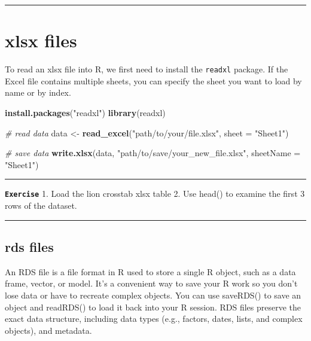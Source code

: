 \documentclass[
]{book}
\newenvironment{Shaded}{\begin{snugshade}}{\end{snugshade}}
\newcommand{\AttributeTok}[1]{\textcolor[rgb]{0.13,0.29,0.53}{#1}}
\newcommand{\CommentTok}[1]{\textcolor[rgb]{0.56,0.35,0.01}{\textit{#1}}}
\newcommand{\FunctionTok}[1]{\textcolor[rgb]{0.13,0.29,0.53}{\textbf{#1}}}
\newcommand{\NormalTok}[1]{#1}
\newcommand{\OtherTok}[1]{\textcolor[rgb]{0.56,0.35,0.01}{#1}}
\newcommand{\StringTok}[1]{\textcolor[rgb]{0.31,0.60,0.02}{#1}}
\begin{document}
\begin{center}\rule{0.5\linewidth}{0.5pt}\end{center}

\section{xlsx files}\label{xlsx-files}

To read an xlsx file into R, we first need to install the \texttt{readxl} package. If the Excel file contains multiple sheets, you can specify the sheet you want to load by name or by index.

\begin{Shaded}
\begin{Highlighting}[]
\FunctionTok{install.packages}\NormalTok{(}\StringTok{"readxl"}\NormalTok{)}
\FunctionTok{library}\NormalTok{(readxl)}

\CommentTok{\# read data}
\NormalTok{data }\OtherTok{\textless{}{-}} \FunctionTok{read\_excel}\NormalTok{(}\StringTok{"path/to/your/file.xlsx"}\NormalTok{, }\AttributeTok{sheet =} \StringTok{"Sheet1"}\NormalTok{)}

\CommentTok{\# save data}
\FunctionTok{write.xlsx}\NormalTok{(data, }\StringTok{"path/to/save/your\_new\_file.xlsx"}\NormalTok{, }\AttributeTok{sheetName =} \StringTok{"Sheet1"}\NormalTok{)}
\end{Highlighting}
\end{Shaded}

\begin{center}\rule{0.5\linewidth}{0.5pt}\end{center}

\textbf{\texttt{Exercise}}
1. Load the lion crosstab xlsx table
2. Use head() to examine the first 3 rows of the dataset.

\begin{center}\rule{0.5\linewidth}{0.5pt}\end{center}

\subsection{rds files}\label{rds-files}

An RDS file is a file format in R used to store a single R object, such as a data frame, vector, or model. It's a convenient way to save your R work so you don't lose data or have to recreate complex objects. You can use saveRDS() to save an object and readRDS() to load it back into your R session. RDS files preserve the exact data structure, including data types (e.g., factors, dates, lists, and complex objects), and metadata.
\end{document}
